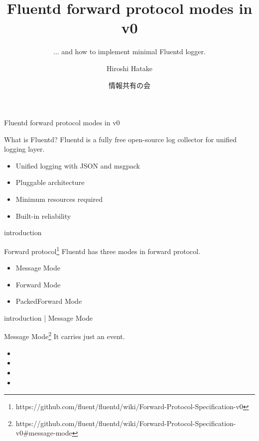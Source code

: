 \documentclass[12pt, unicode]{beamer}
\title{Fluentd forward protocol modes in v0}
\subtitle{... and how to implement minimal Fluentd logger.}
\author{Hiroshi Hatake}
\date[2016/04/08]{情報共有の会}
\begin{document}
\frame{\maketitle}

\begin{frame}{Fluentd forward protocol modes in v0}
\begin{block}{What is Fluentd?}
Fluentd is a fully free open-source log collector for unified logging layer.
\end{block}
\begin{itemize}
\item<2-> Unified logging with JSON and msgpack
\item<3-> Pluggable architecture
\item<4-> Minimum resources required
\item<5-> Built-in reliability
\end{itemize}
\end{frame}

\begin{frame}{introduction}
\begin{block}{Forward protocol\footnote[frame]{https://github.com/fluent/fluentd/wiki/Forward-Protocol-Specification-v0}}
Fluentd has three modes in forward protocol.
\end{block}
\begin{itemize}
\item<1-> Message Mode
\item<2-> Forward Mode
\item<3-> PackedForward Mode
\end{itemize}
\end{frame}

\begin{frame}{introduction | Message Mode}
\begin{block}{Message Mode\footnote[frame]{https://github.com/fluent/fluentd/wiki/Forward-Protocol-Specification-v0\#message-mode}}
It carries just an event.
\end{block}
\begin{itemize}
\item {}
\item {}
\item {}
\item {}
\end{itemize}
\end{frame}
\end{document}
